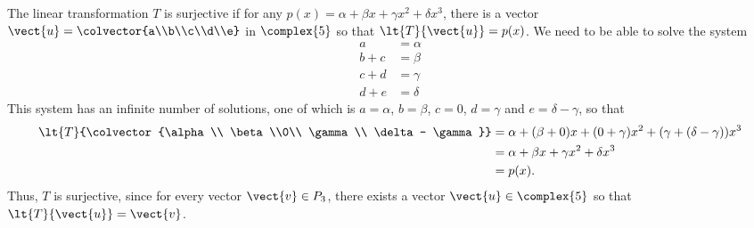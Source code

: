 The linear transformation $T$ is surjective if for any $p(x) = \alpha + \beta x + \gamma x^2 + \delta x^3$, there is a vector $\vect{u} = \colvector{a\\b\\c\\d\\e}$ in $\complex{5}$ so that $\lt{T}{\vect{u}} = p(x)$.  We need to be able to solve the system
%
\begin{align*}
a &=\alpha\\
b+c &= \beta\\
c + d &= \gamma\\
d + e &= \delta
\end{align*}
%
This system has an infinite number of solutions, one of which is $a = \alpha$, $b = \beta$, $c = 0$, $d = \gamma$ and $e = \delta - \gamma$, so that 
%
\begin{align*}
\lt{T}{\colvector{\alpha\\ \beta\\0\\ \gamma \\ \delta - \gamma}} 
&= \alpha + (\beta + 0)x + (0 + \gamma) x^2 + (\gamma + (\delta - \gamma)) x^3\\
&= \alpha + \beta x + \gamma x^2 + \delta x^3\\
&= p(x).
\end{align*}
Thus, $T$ is surjective, since for every vector $\vect{v} \in P_3$, there exists a vector $\vect{u} \in \complex{5}$ so that $\lt{T}{\vect{u}} = \vect{v}$.